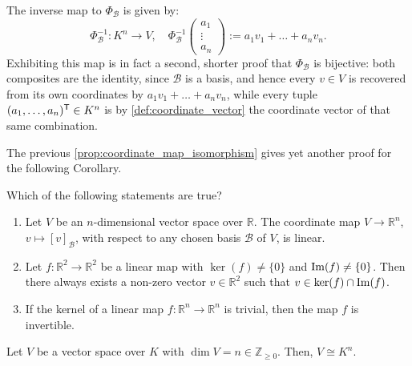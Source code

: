 \begin{remark}
The inverse map to $\Phi_{\mathcal{B}}$ is given by:
\[
\Phi_{\mathcal{B}}^{-1}: K^n \to V, \quad \Phi_{\mathcal{B}}^{-1}
\begin{pmatrix}
a_1 \\
\vdots \\
a_n
\end{pmatrix}
:= a_1 v_1 + \dots + a_n v_n.
\]
Exhibiting this map is in fact a second, shorter proof that $\Phi_{\mathcal{B}}$ is bijective: both composites are the identity, since $\mathcal{B}$ is a basis, and hence every $v \in V$ is recovered from its own coordinates by $a_1 v_1 + \dots + a_n v_n$, while every tuple $(a_1, \dots, a_n)^{\mathsf{T}} \in K^n$ is by \cref{def:coordinate_vector} the coordinate vector of that same combination.
\end{remark}

\begin{remark}
The previous \cref{prop:coordinate_map_isomorphism} gives yet another proof for the following Corollary.
\end{remark}

\begin{exercise}
\label{exc:properties_coordinate_maps_mc}
Which of the following statements are true?
\begin{enumerate}
    \item Let $V$ be an $n$-dimensional vector space over $\mathbb{R}$. The coordinate map $V \to \mathbb{R}^n$, $v \mapsto [v]_{\mathcal{B}}$, with respect to any chosen basis $\mathcal{B}$ of $V$, is linear.
    \item Let $f \colon \mathbb{R}^2 \to \mathbb{R}^2$ be a linear map with $\ker(f) \ne \{0\}$ and $\operatorname{Im}(f) \ne \{0\}$. Then there always exists a non-zero vector $v \in \mathbb{R}^2$ such that $v \in \ker(f) \cap \operatorname{Im}(f)$.
    \item If the kernel of a linear map $f \colon \mathbb{R}^n \to \mathbb{R}^n$ is trivial, then the map $f$ is invertible.
\end{enumerate}
\end{exercise}

\begin{corollary}
\label{cor:vs_isomorphic_to_kn}
Let $V$ be a vector space over $K$ with $\dim V = n \in \mathbb{Z}_{\ge 0}$. Then, $V \cong K^n$.
\end{corollary}

